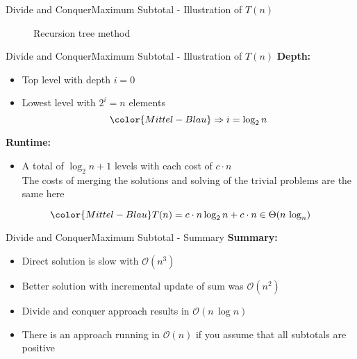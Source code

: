 
\begin{frame}{Divide and Conquer}{Maximum Subtotal - Illustration of $T(n)$}
  \begin{figure}
    \begin{adjustbox}{width=\linewidth}
      
    \end{adjustbox}
    \caption{Recursion tree method}
    \label{fig:divide_and_conquer:max_sub_array_runtime_tree}
  \end{figure}
\end{frame}


\begin{frame}{Divide and Conquer}{Maximum Subtotal - Illustration of $T(n)$}
  \textbf{Depth:}
  \begin{itemize}
    \item
      Top level with depth {\color{Mittel-Blau}$i = 0$}
    \item
      Lowest level with {\color{Mittel-Blau}$2^i = n$} elements
      \begin{displaymath}
        {\color{Mittel-Blau}\Rightarrow i = \log_2 n}
      \end{displaymath}
  \end{itemize}
  \textbf{Runtime:}
  \begin{itemize}
    \item
      A total of {\color{Mittel-Blau}$\log_2 n + 1$} levels with each cost of
      {\color{Mittel-Blau}$c \cdot n$}\\
      \color{gray}
      The costs of merging the solutions and solving of the trivial
      problems are the same here
  \end{itemize}
  \begin{displaymath}
    {\color{Mittel-Blau}
    T(n) = c \cdot n \log_2 n + c \cdot n \in \Theta(n\,\log_n)}
  \end{displaymath}
\end{frame}


\begin{frame}{Divide and Conquer}{Maximum Subtotal - Summary}
  \textbf{Summary:}
  \begin{itemize}
    \item
      Direct solution is slow with {\color{Mittel-Blau}$\mathcal{O}(n^3)$}
    \item
      Better solution with incremental update of sum was
      {\color{Mittel-Blau}$\mathcal{O}(n^2)$}
    \item
      Divide and conquer approach results in
      {\color{Mittel-Blau}$\mathcal{O}(n\,\log n)$}
    \item
      There is an approach running in {\color{Mittel-Blau}$\mathcal{O}(n)$}
      if you assume that all subtotals are positive
  \end{itemize}
\end{frame}

